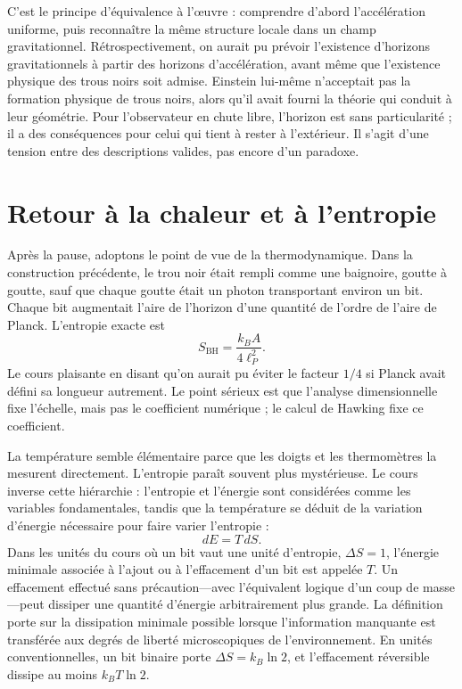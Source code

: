 C’est le principe d’équivalence à l’œuvre : comprendre d’abord l’accélération uniforme, puis reconnaître la même structure locale dans un champ gravitationnel. Rétrospectivement, on aurait pu prévoir l’existence d’horizons gravitationnels à partir des horizons d’accélération, avant même que l’existence physique des trous noirs soit admise. Einstein lui-même n’acceptait pas la formation physique de trous noirs, alors qu’il avait fourni la théorie qui conduit à leur géométrie. Pour l’observateur en chute libre, l’horizon est sans particularité ; il a des conséquences pour celui qui tient à rester à l’extérieur. Il s’agit d’une tension entre des descriptions valides, pas encore d’un paradoxe.

\section{Retour à la chaleur et à l’entropie}

Après la pause, adoptons le point de vue de la thermodynamique. Dans la construction précédente, le trou noir était rempli comme une baignoire, goutte à goutte, sauf que chaque goutte était un photon transportant environ un bit. Chaque bit augmentait l’aire de l’horizon d’une quantité de l’ordre de l’aire de Planck. L’entropie exacte est
\begin{equation}
S_{\mathrm{BH}}=\frac{k_B A}{4\ell_P^2}.
\end{equation}
Le cours plaisante en disant qu’on aurait pu éviter le facteur \(1/4\) si Planck avait défini sa longueur autrement. Le point sérieux est que l’analyse dimensionnelle fixe l’échelle, mais pas le coefficient numérique ; le calcul de Hawking fixe ce coefficient.

La température semble élémentaire parce que les doigts et les thermomètres la mesurent directement. L’entropie paraît souvent plus mystérieuse. Le cours inverse cette hiérarchie : l’entropie et l’énergie sont considérées comme les variables fondamentales, tandis que la température se déduit de la variation d’énergie nécessaire pour faire varier l’entropie :
\begin{equation}
dE=T\,dS.
\end{equation}
Dans les unités du cours où un bit vaut une unité d’entropie, \(\Delta S=1\), l’énergie minimale associée à l’ajout ou à l’effacement d’un bit est appelée \(T\). Un effacement effectué sans précaution---avec l’équivalent logique d’un coup de masse---peut dissiper une quantité d’énergie arbitrairement plus grande. La définition porte sur la dissipation minimale possible lorsque l’information manquante est transférée aux degrés de liberté microscopiques de l’environnement. En unités conventionnelles, un bit binaire porte \(\Delta S=k_B\ln2\), et l’effacement réversible dissipe au moins \(k_BT\ln2\).

